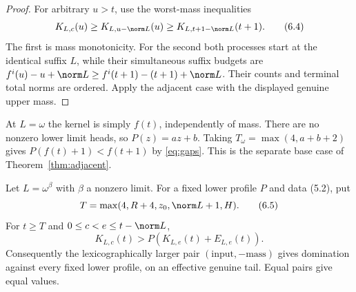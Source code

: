 \documentclass[11pt,a4paper]{article}
\newcommand{\KK}[2]{K_{#1,#2}}
\newcommand{\EE}[2]{E_{#1,#2}}
\begin{document}
\begin{proof}
For arbitrary $u>t$, use the worst-mass inequalities
\[
 \KK Lc(u)\ge \KK L{u-\norm L}(u)
          \ge \KK L{t+1-\norm L}(t+1).              \tag{6.4}
\]
The first is mass monotonicity. For the second both processes start at
the identical suffix $L$, while their simultaneous suffix budgets are
$f^i(u)-u+\norm L\ge f^i(t+1)-(t+1)+\norm L$.
Their counts and terminal total norms are ordered. Apply the adjacent
case with the displayed genuine upper mass.
\end{proof}

At $L=\omega$ the kernel is simply $f(t)$, independently of mass. There
are no nonzero lower limit heads, so $P(z)=az+b$. Taking
$T_\omega=\max(4,a+b+2)$ gives
$P(f(t)+1)<f(t+1)$ by \eqref{eq:gaps}. This is the separate base case of
Theorem~\ref{thm:adjacent}.

\begin{theorem}\label{thm:limitmass}
Let $L=\omega^\beta$ with $\beta$ a nonzero limit. For a fixed lower
profile $P$ and data (5.2), put
\[
           T=\max(4,R+4,z_0,\norm L+1,H).            \tag{6.5}
\]
For $t\ge T$ and $0\le c<e\le t-\norm L$,
\[
                \KK Lc(t)>P(\KK Le(t)+\EE Le(t)).    \tag{6.6}
\]
Consequently the lexicographically larger pair $(\text{input},-\text{mass})$
gives domination against every fixed lower profile, on an effective
genuine tail. Equal pairs give equal values.
\end{theorem}
\end{document}

